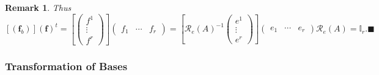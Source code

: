 \documentclass[aps,preprint]{revtex4}
\newtheorem{remark}[theorem]{Remark}
\begin{document}
\begin{remark}
Thus 
\begin{equation}
\left[ \left( \boldsymbol{f}_{b}\right) \right] \left( \boldsymbol{f}\right)
^{t}=\left[ \left( 
\begin{array}{c}
f^{1} \\ 
\vdots \\ 
f^{r}%
\end{array}%
\right) \right] \left( 
\begin{array}{ccc}
f_{1} & \cdots & f_{r}%
\end{array}%
\right) =\left[ \mathcal{R}_{e}\left( A\right) ^{-1}\left( 
\begin{array}{c}
e^{1} \\ 
\vdots \\ 
e^{r}%
\end{array}%
\right) \right] \left( 
\begin{array}{ccc}
e_{1} & \cdots & e_{r}%
\end{array}%
\right) \mathcal{R}_{e}\left( A\right) =\mathbb{I}_{r}.\blacksquare
\end{equation}
\end{remark}

\subsubsection{Transformation of Bases \label{Transformation of Bases}}
\end{document}
